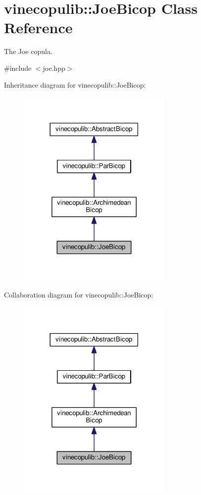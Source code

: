 \hypertarget{classvinecopulib_1_1_joe_bicop}{}\section{vinecopulib\+:\+:Joe\+Bicop Class Reference}
\label{classvinecopulib_1_1_joe_bicop}


The Joe copula.  




{\ttfamily \#include $<$joe.\+hpp$>$}



Inheritance diagram for vinecopulib\+:\+:Joe\+Bicop\+:
\nopagebreak
\begin{figure}[H]
\begin{center}
\leavevmode
\includegraphics[width=213pt]{classvinecopulib_1_1_joe_bicop__inherit__graph}
\end{center}
\end{figure}


Collaboration diagram for vinecopulib\+:\+:Joe\+Bicop\+:
\nopagebreak
\begin{figure}[H]
\begin{center}
\leavevmode
\includegraphics[width=213pt]{classvinecopulib_1_1_joe_bicop__coll__graph}
\end{center}
\end{figure}
